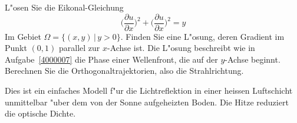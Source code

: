 L"osen Sie die Eikonal-Gleichung
\begin{equation}
\biggl( \frac{\partial u}{\partial x} \biggr)^2
+
\biggl( \frac{\partial u}{\partial x} \biggr)^2
=
y
\label{4000008:eikonal}
\end{equation}
Im Gebiet $\Omega=\{(x,y)\,|\, y > 0\}$.
Finden Sie eine L"osung, deren Gradient im Punkt $(0,1)$ parallel
zur $x$-Achse ist.
Die L"osung beschreibt wie in Aufgabe~\ref{4000007} die
Phase einer Wellenfront, die auf der $y$-Achse beginnt.
Berechnen Sie die Orthogonaltrajektorien, also die Strahlrichtung.

\begin{hinweis}
Dies ist ein einfaches Modell f"ur die Lichtreflektion in einer
heissen Luftschicht unmittelbar "uber dem von der Sonne aufgeheizten
Boden. Die Hitze reduziert die optische Dichte.
\end{hinweis}

